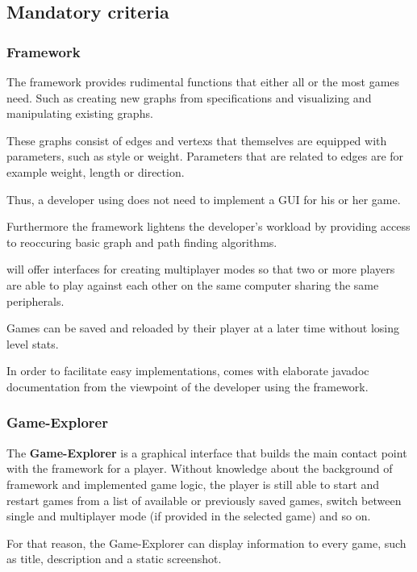 \subsection{Mandatory criteria}\label{REF:MANDATORY-CRITERIA}
\subsubsection{Framework}
The framework provides rudimental functions that either all or the most \glspl{game} need. Such as creating new \glspl{graph} from specifications and visualizing and manipulating existing graphs.\par
These graphs consist of \glspl{edge} and \glspl{vertex} that themselves are equipped with parameters, such as style or weight. Parameters that are related to edges are for example weight, length or direction.\par
Thus, a \gls{developer} using {\graphioli} does not need to implement a \gls{GUI} for his or her game.\par
Furthermore the framework lightens the developer's workload by providing access to reoccuring basic graph and \gls{path} finding algorithms.\par
{\graphioli} will offer interfaces for creating multiplayer modes so that two or more \glspl{player} are able to play against each other on the same computer sharing the same peripherals.\par
Games can be saved and reloaded by their player at a later time without losing \gls{level} stats.\par
In order to facilitate easy implementations, {\graphioli} comes with elaborate \Gls{javadoc} documentation from the viewpoint of the developer using the framework.\par

\subsubsection{Game-Explorer}
The \textbf{Game-Explorer} is a graphical interface that builds the main contact point with the framework for a \gls{player}. Without knowledge about the background of framework and implemented \gls{game} logic, the player is still able to start and restart games from a list of available or previously saved games, switch between single and multiplayer mode (if provided in the selected game) and so on.\par
For that reason, the Game-Explorer can display information to every game, such as title, description and a static screenshot.\par

